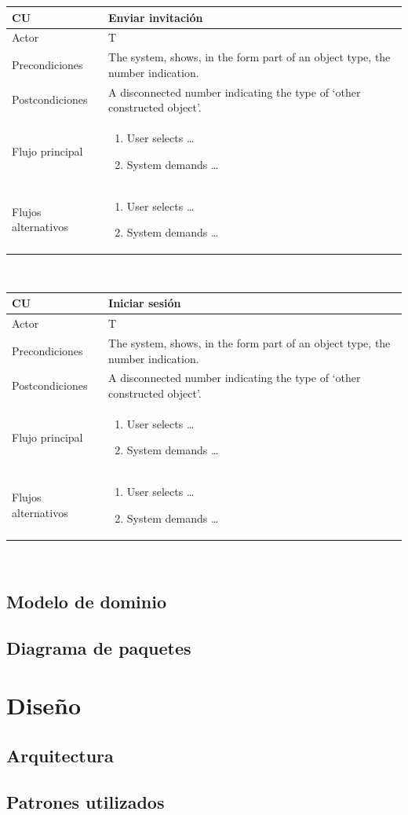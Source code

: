 \documentclass[twoside]{report}
\newcommand\addrow[2]{#1 &#2\\ }
\newcommand\addheading[2]{#1 &#2\\ \hline}
\newcommand\tabularhead{\begin{tabular}{lp{0.7\textwidth}}
\hline
}
\newcommand\addmulrow[2]{ \begin{minipage}[t][][t]{2.5cm}#1\end{minipage}%
   &\begin{minipage}[t][][t]{8cm}
    \begin{enumerate} #2   \end{enumerate}
    \end{minipage}\\ }
\newenvironment{usecase}{\tabularhead}
{\hline\end{tabular}}
\begin{document}
\begin{usecase}
  \addheading{\textbf{CU\arabic{usecase}}}{Enviar invitación} 
  \addrow{Actor}{T}
  \addrow{Precondiciones}{The system, shows, in the form part of an object type, the number indication.}
  \addrow{Postcondiciones}{A disconnected number indicating the type of `other constructed object'.}
  \addmulrow{Flujo principal}{
  		\item User selects \ldots
        \item System demands \ldots
  }
  \addmulrow{Flujos alternativos}{
  		\item User selects \ldots
        \item System demands \ldots
  }
\end{usecase}\\

\begin{usecase}
  \addheading{\textbf{CU\arabic{usecase}}}{Iniciar sesión} 
  \addrow{Actor}{T}
  \addrow{Precondiciones}{The system, shows, in the form part of an object type, the number indication.}
  \addrow{Postcondiciones}{A disconnected number indicating the type of `other constructed object'.}
  \addmulrow{Flujo principal}{
  		\item User selects \ldots
        \item System demands \ldots
  }
  \addmulrow{Flujos alternativos}{
  		\item User selects \ldots
        \item System demands \ldots
  }
\end{usecase}\\

\subsection{Modelo de dominio}
\subsection{Diagrama de paquetes}
\section{Diseño}
\subsection{Arquitectura}
\subsection{Patrones utilizados}
\end{document}
